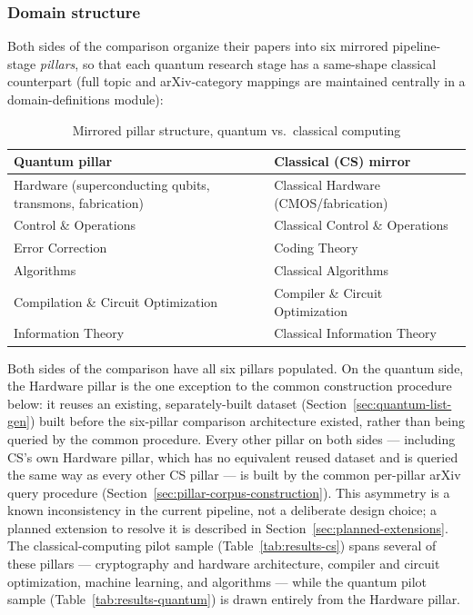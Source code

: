 \documentclass[11pt]{article}
\begin{document}
\subsubsection{Domain structure}
Both sides of the comparison organize their papers into six mirrored pipeline-stage
\emph{pillars}, so that each quantum research stage has a same-shape classical
counterpart (full topic and arXiv-category mappings are maintained centrally in a
domain-definitions module):

\begin{table}[htbp]
\centering
\caption{Mirrored pillar structure, quantum vs.\ classical computing}
\label{tab:pillars}
\begin{tabular}{@{}p{4.7cm} p{6.8cm}@{}}
\toprule
Quantum pillar & Classical (CS) mirror \\
\midrule
Hardware (superconducting qubits, transmons, fabrication) & Classical Hardware (CMOS/fabrication) \\
Control \& Operations & Classical Control \& Operations \\
Error Correction & Coding Theory \\
Algorithms & Classical Algorithms \\
Compilation \& Circuit Optimization & Compiler \& Circuit Optimization \\
Information Theory & Classical Information Theory \\
\bottomrule
\end{tabular}
\end{table}

Both sides of the comparison have all six pillars populated. On the quantum side, the
Hardware pillar is the one exception to the common construction procedure below: it
reuses an existing, separately-built dataset (Section~\ref{sec:quantum-list-gen}) built
before the six-pillar comparison architecture existed, rather than being queried by
the common procedure. Every other pillar on both sides --- including CS's own Hardware
pillar, which has no equivalent reused dataset and is queried the same way as every
other CS pillar --- is built by the common per-pillar arXiv query procedure
(Section~\ref{sec:pillar-corpus-construction}). This asymmetry is a known
inconsistency in the current pipeline, not a deliberate design choice; a planned
extension to resolve it is described in
Section~\ref{sec:planned-extensions}. The classical-computing pilot sample
(Table~\ref{tab:results-cs}) spans several of these pillars --- cryptography and
hardware architecture, compiler and circuit optimization, machine learning, and
algorithms --- while the quantum pilot sample (Table~\ref{tab:results-quantum}) is
drawn entirely from the Hardware pillar.
\end{document}
